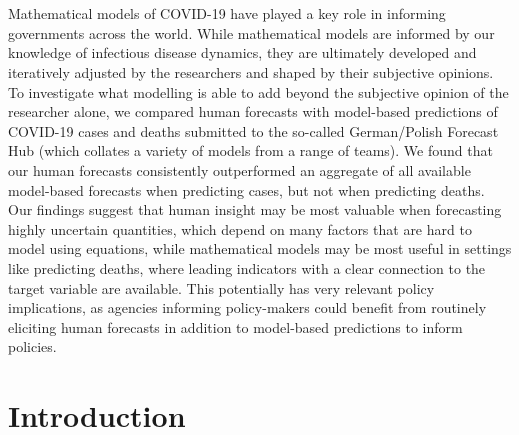 \documentclass[10pt,letterpaper]{article} %
\providecommand{\DIFaddtex}[1]{{\protect\color{blue}\uwave{#1}}} %
\providecommand{\DIFaddbegin}{} %
\providecommand{\DIFaddend}{} %
\providecommand{\DIFdelbegin}{} %
\providecommand{\DIFdelend}{} %
\providecommand{\DIFadd}[1]{\texorpdfstring{\DIFaddtex{#1}}{#1}} %
\newcommand{\DIFscaledelfig}{0.5}
\newlength{\DIFdelgraphicswidth} %
\newlength{\DIFdelgraphicsheight} %
\newcommand{\DIFaddincludegraphics}[2][]{{\color{blue}\fbox{\DIFOincludegraphics[#1]{#2}}}} %
\newcommand{\DIFdelincludegraphics}[2][]{%
\sbox{\DIFdelgraphicsbox}{\DIFOincludegraphics[#1]{#2}}%
\settoboxwidth{\DIFdelgraphicswidth}{\DIFdelgraphicsbox} %
\settoboxtotalheight{\DIFdelgraphicsheight}{\DIFdelgraphicsbox} %
\scalebox{\DIFscaledelfig}{%
\parbox[b]{\DIFdelgraphicswidth}{\usebox{\DIFdelgraphicsbox}\\[-\baselineskip] \rule{\DIFdelgraphicswidth}{0em}}\llap{\resizebox{\DIFdelgraphicswidth}{\DIFdelgraphicsheight}{%
\setlength{\unitlength}{\DIFdelgraphicswidth}%
\begin{picture}(1,1)%
\thicklines\linethickness{2pt} %
{\color[rgb]{1,0,0}\put(0,0){\framebox(1,1){}}}%
{\color[rgb]{1,0,0}\put(0,0){\line( 1,1){1}}}%
{\color[rgb]{1,0,0}\put(0,1){\line(1,-1){1}}}%
\end{picture}%
}\hspace*{3pt}}} %
} %
\DeclareRobustCommand{\DIFaddbegin}{\DIFOaddbegin \let\includegraphics\DIFaddincludegraphics} %
\DeclareRobustCommand{\DIFaddend}{\DIFOaddend \let\includegraphics\DIFOincludegraphics} %
\DeclareRobustCommand{\DIFdelbegin}{\DIFOdelbegin \let\includegraphics\DIFdelincludegraphics} %
\DeclareRobustCommand{\DIFdelend}{\DIFOaddend \let\includegraphics\DIFOincludegraphics} %
\begin{document}
\DIFdelend %
\DIFaddbegin \section*{\DIFadd{Author summary}}
\DIFaddend Mathematical models of COVID-19 have played a key role in informing
governments across the world. While mathematical models are informed by
our knowledge of infectious disease dynamics, they are ultimately
developed and iteratively adjusted by the researchers and shaped by
their subjective opinions. To investigate what modelling is able to add
beyond the subjective opinion of the researcher alone, we compared human
forecasts with model-based predictions of COVID-19 cases and deaths
submitted to the so-called German/Polish Forecast Hub (which collates a
variety of models from a range of teams). \DIFdelbegin %
\DIFdelend \DIFaddbegin \DIFadd{\textbar{} }\DIFaddend We found that our
human forecasts consistently outperformed an aggregate of all available
model-based forecasts when predicting cases, but not when predicting
deaths. Our findings suggest that human insight may be most valuable
when forecasting highly uncertain quantities, which depend on many
factors that are hard to model using equations, while mathematical
models may be most useful in settings like predicting deaths, where
leading indicators with a clear connection to the target variable are
available. This potentially has very relevant policy implications, as
agencies informing policy-makers could benefit from routinely eliciting
human forecasts in addition to model-based predictions to inform
policies.

\DIFaddbegin \linenumbers

\DIFaddend \hypertarget{introduction}{%
\section{Introduction}\label{introduction}}
\end{document}
